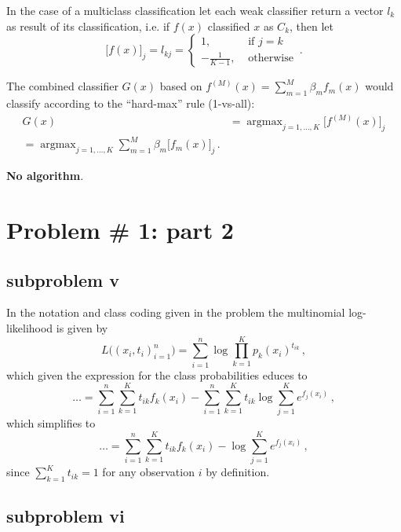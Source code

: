 \documentclass[a4paper]{article}
\newcommand{\argmax}{\mathop{\text{argmax}}}
\begin{document}
In the case of a multiclass classification let each weak classifier return a vector
$l_k$ as result of its classification, i.e. if $f(x)$ classified $x$ as $C_k$,
then let
\[
\bigl[f(x)\bigr]_j = l_{kj} = \begin{cases}
	1, &\text{ if } j = k\\
	- \frac{1}{K-1}, &\text{ otherwise}
\end{cases}\,.
\]

The combined classifier $G(x)$ based on $f^{(M)}(x) = \sum_{m=1}^M \beta_m f_m(x)$
would classify according to the ``hard-max'' rule (1-vs-all):
\begin{align*}
	G(x)
	&= \argmax_{j=1,\ldots, K} \bigl[f^{(M)}(x)\bigr]_j \\
	= \argmax_{j=1,\ldots, K} \sum_{m=1}^M \beta_m \bigl[f_m(x)\bigr]_j \,.
\end{align*}

\textbf{No algorithm}.



\section{Problem \# 1: part 2} %
\label{sec:problem_1_part_2}

\subsection{subproblem v} %
\label{sub:subproblem_v}

In the notation and class coding given in the problem the multinomial log-likelihood
is given by
\[
L\bigl((x_i,t_i)_{i=1}^n\bigr) = \sum_{i=1}^n \log \prod_{k=1}^K p_k(x_i)^{t_{ik}} \,,
\]
which given the expression for the class probabilities educes to
\[
\ldots
= \sum_{i=1}^n \sum_{k=1}^K t_{ik} f_k(x_i)
- \sum_{i=1}^n \sum_{k=1}^K t_{ik} \log \sum_{j=1}^K e^{f_j(x_i)} \,,
\]
which simplifies to
\[
\ldots = \sum_{i=1}^n \sum_{k=1}^K t_{ik} f_k(x_i) - \log \sum_{j=1}^K e^{f_j(x_i)} \,,
\]
since $\sum_{k=1}^K t_{ik} = 1$ for any observation $i$ by definition.


\subsection{subproblem vi} %
\label{sub:subproblem_vi}
\end{document}
